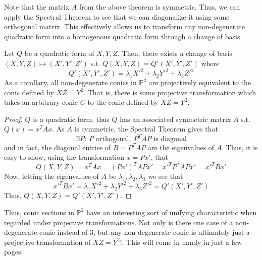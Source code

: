Note that the matrix $A$ from the above theorem is symmetric. Thus, we can
apply the Spectral Theorem to see that we can diagonalize it using some
orthogonal matrix. This effectively allows us to transform any non-degenerate 
quadratic form into a homogenous quadratic form through a change of basis.

\begin{theorem}
Let $Q$ be a quadratic form of $X, Y, Z$. Then, there exists a change of basis $(X,Y,Z) \mapsto (X',Y',Z')$ s.t.
$Q(X,Y,Z) = Q'(X',Y',Z')$ where
\[
Q'(X',Y',Z') = \lambda_1 X'^2 + \lambda_2 Y'^2 + \lambda_3 Z'^2
\]
As a corollary, all non-degenerate conics in $\mathbb{P}^2$ are projectively
equivalent to the conic defined by $XZ = Y^2$. That is, there is some
projective transformation which takes an arbitrary conic $C$ to the conic 
defined by $XZ = Y^2$.
\end{theorem}
\begin{proof}
$Q$ is a quadratic form,
thus $Q$ has an associated symmetric matrix 
$A$ s.t. $Q(x) = x^TAx$. As $A$ is symmetric, the Spectral Theorem gives that
\[
\exists P:~P\text{ orthogonal},~P^TAP\text{ is diagonal}
\]
and in fact, the diagonal entries of $B=P^TAP$ are the eigenvalues of $A$. Thus,
it is easy to show, using the transformation $x=Px'$, that
\[
Q(X,Y,Z) = x^TAx = (Px')^TAPx' = x'^TP^TAPx' = x'^TBx'
\]
Now, letting the eigenvalues of $A$ be $\lambda_1, \lambda_2, \lambda_3$ we see that
\[
x'^TBx' = \lambda_1 X'^2 + \lambda_2 Y'^2 + \lambda_3 Z'^2 = Q'(X',Y',Z')
\]
Thus, $Q(X,Y,Z) = Q'(X',Y',Z')$.
\end{proof}
Thus, conic sections in $\mathbb{P}^2$ have an interesting sort of 
unifying characteristic when regarded under projective transformations.
Not only is there one case of a non-degenerate conic instead of 3,
but any non-degenerate conic is ultimately just a projective transformation
of $XZ=Y^2$!. This will come in handy in just a few pages.
